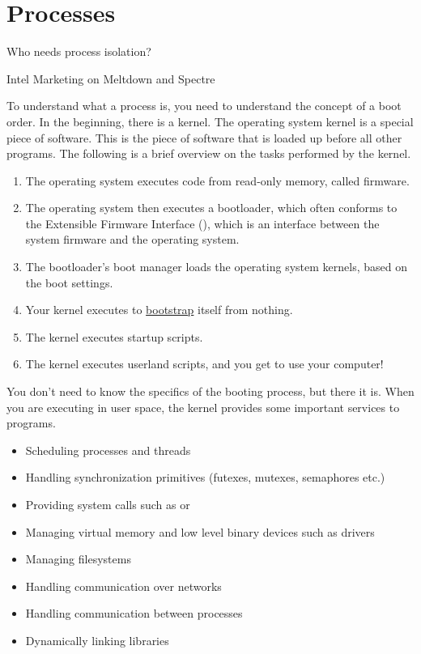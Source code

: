 \chapter{Processes}

\epigraph{Who needs process isolation?}{Intel Marketing on Meltdown and Spectre}

To understand what a process is, you need to understand the concept of a boot order.
In the beginning, there is a kernel.
The operating system kernel is a special piece of software.
This is the piece of software that is loaded up before all other programs.
The following is a brief overview on the tasks performed by the kernel.

\begin{enumerate}
\item The operating system executes code from read-only memory, called firmware.
\item The operating system then executes a bootloader, which often conforms to the Extensible Firmware Interface (), which is an interface between the system firmware and the operating system.
\item The bootloader's boot manager loads the operating system kernels, based on the boot settings.
\item
  Your kernel executes  to \href{https://en.wikipedia.org/wiki/Bootstrapping}{bootstrap} itself from nothing.
\item The kernel executes startup scripts.
\item The kernel executes userland scripts, and you get to use your computer!
\end{enumerate}

You don't need to know the specifics of the booting process, but there it is.
When you are executing in user space, the kernel provides some important services to programs.

\begin{itemize}
    \item Scheduling processes and threads
    \item Handling synchronization primitives (futexes, mutexes, semaphores etc.)
    \item Providing system calls such as  or 
    \item Managing virtual memory and low level binary devices such as  drivers
    \item Managing filesystems
    \item Handling communication over networks
    \item Handling communication between processes
    \item Dynamically linking libraries
\end{itemize}

